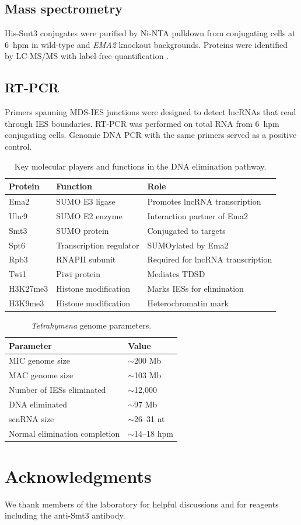 \documentclass[11pt,a4paper]{article}
\begin{document}
\subsection{Mass spectrometry}
His-Smt3 conjugates were purified by Ni-NTA pulldown from conjugating cells at 6~hpm in wild-type and \textit{EMA2} knockout backgrounds. Proteins were identified by LC-MS/MS with label-free quantification \citep{Cox2014}.

\subsection{RT-PCR}
Primers spanning MDS-IES junctions were designed to detect lncRNAs that read through IES boundaries. RT-PCR was performed on total RNA from 6~hpm conjugating cells. Genomic DNA PCR with the same primers served as a positive control.

\begin{table}[htbp]
\centering
\caption{Key molecular players and functions in the DNA elimination pathway.}
\label{tab:players}
\begin{tabular}{lll}
\toprule
\textbf{Protein} & \textbf{Function} & \textbf{Role} \\
\midrule
Ema2 & SUMO E3 ligase & Promotes lncRNA transcription \\
Ubc9 & SUMO E2 enzyme & Interaction partner of Ema2 \\
Smt3 & SUMO protein & Conjugated to targets \\
Spt6 & Transcription regulator & SUMOylated by Ema2 \\
Rpb3 & RNAPII subunit & Required for lncRNA transcription \\
Twi1 & Piwi protein & Mediates TDSD \\
H3K27me3 & Histone modification & Marks IESs for elimination \\
H3K9me3 & Histone modification & Heterochromatin mark \\
\bottomrule
\end{tabular}
\end{table}

\begin{table}[htbp]
\centering
\caption{\textit{Tetrahymena} genome parameters.}
\label{tab:genome}
\begin{tabular}{ll}
\toprule
\textbf{Parameter} & \textbf{Value} \\
\midrule
MIC genome size & $\sim$200 Mb \\
MAC genome size & $\sim$103 Mb \\
Number of IESs eliminated & $\sim$12,000 \\
DNA eliminated & $\sim$97 Mb \\
scnRNA size & $\sim$26--31 nt \\
Normal elimination completion & $\sim$14--18 hpm \\
\bottomrule
\end{tabular}
\end{table}

\section*{Acknowledgments}
We thank members of the laboratory for helpful discussions and for reagents including the anti-Smt3 antibody.


\end{document}
